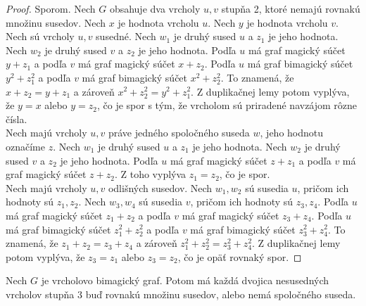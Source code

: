 \begin{proof} Sporom. Nech $G$ obsahuje dva vrcholy $u,v$ stupňa 2, ktoré nemajú rovnakú množinu susedov. Nech $x$ je hodnota vrcholu $u$. Nech $y$ je hodnota vrcholu $v$. \\

Nech sú vrcholy $u,v$ susedné. Nech $w_1$ je druhý sused $u$ a $z_1$ je jeho hodnota. Nech $w_2$ je druhý sused $v$ a $z_2$ je jeho hodnota. Podľa $u$ má graf magický súčet $y + z_1$ a podľa $v$ má graf magický súčet $x + z_2$. Podľa $u$ má graf bimagický súčet $y^2 + z^2_1$ a podľa $v$ má graf bimagický súčet $x^2 + z^2_2$.  To znamená, že $x + z_2 = y + z_1$ a zároveň $x^2 + z^2_2 = y^2 + z^2_1$. Z duplikačnej lemy potom vyplýva, že $y = x$ alebo $y = z_2$, čo je spor s tým, že vrcholom sú priradené navzájom rôzne čísla. \\

Nech majú vrcholy $u,v$ práve jedného spoločného suseda $w$, jeho hodnotu označíme $z$. Nech $w_1$ je druhý sused $u$ a $z_1$ je jeho hodnota. Nech $w_2$ je druhý sused $v$ a $z_2$ je jeho hodnota. Podľa $u$ má graf magický súčet $z + z_1$ a podľa $v$ má graf magický súčet $z + z_2$. Z toho vyplýva $z_1 = z_2$, čo je spor. \\

Nech majú vrcholy $u,v$ odlišných susedov. Nech $w_1, w_2$ sú susedia $u$, pričom ich hodnoty sú $z_1, z_2$. Nech $w_3, w_4$ sú susedia $v$, pričom ich hodnoty sú $z_3, z_4$. Podľa $u$ má graf magický súčet $z_1 + z_2$ a podľa $v$ má graf magický súčet $z_3 + z_4$. Podľa $u$ má graf bimagický súčet $z^2_1 + z^2_2$ a podľa $v$ má graf bimagický súčet $z^2_3 + z^2_4$. To znamená, že $z_1 + z_2 = z_3 + z_4$ a zároveň $z^2_1 + z^2_2 = z^2_3 + z^2_4$. Z duplikačnej lemy potom vyplýva, že $z_3 = z_1$ alebo $z_3 = z_2$, čo je opäť rovnaký spor.
\end{proof}

\begin{subtheorem} Nech $G$ je vrcholovo bimagický graf. Potom má každá dvojica nesusedných vrcholov stupňa 3 buď rovnakú množinu susedov, alebo nemá spoločného suseda.
\end{subtheorem}

